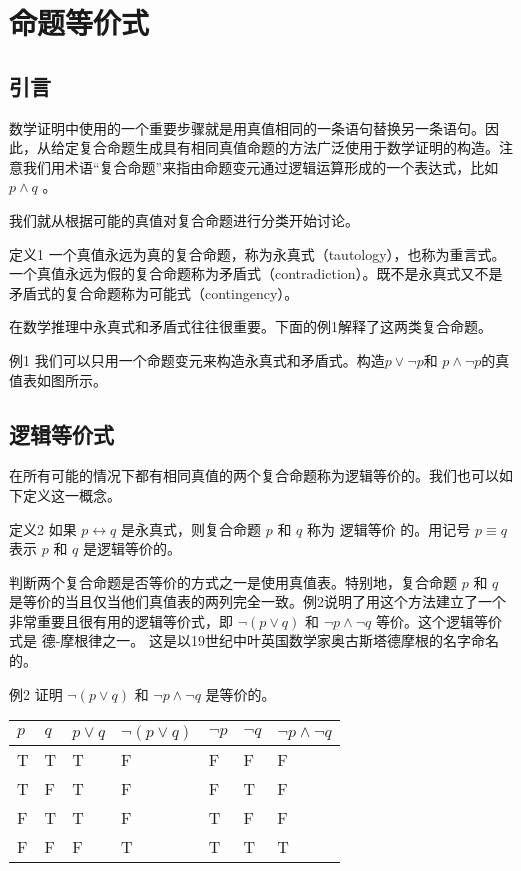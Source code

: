 \section{命题等价式}
\subsection{引言}
数学证明中使用的一个重要步骤就是用真值相同的一条语句替换另一条语句。因此，从给定复合命题生成具有相同真值命题的方法广泛使用于数学证明的构造。注意我们用术语“复合命题”来指由命题变元通过逻辑运算形成的一个表达式，比如 $p \land q$ 。  

我们就从根据可能的真值对复合命题进行分类开始讨论。

定义1  一个真值永远为真的复合命题，称为永真式（tautology），也称为重言式。一个真值永远为假的复合命题称为矛盾式（contradiction）。既不是永真式又不是矛盾式的复合命题称为可能式（contingency）。  

在数学推理中永真式和矛盾式往往很重要。下面的例1解释了这两类复合命题。

例1 我们可以只用一个命题变元来构造永真式和矛盾式。构造$p \lor \neg p $和 $p \land \neg p$的真值表如图所示。

\subsection{逻辑等价式}
在所有可能的情况下都有相同真值的两个复合命题称为逻辑等价的。我们也可以如下定义这一概念。   

定义2  如果 $p \leftrightarrow q$ 是永真式，则复合命题 $p$ 和 $q$ 称为 逻辑等价 的。用记号 $p \equiv q$ 表示 $p$ 和 $q$ 是逻辑等价的。  

判断两个复合命题是否等价的方式之一是使用真值表。特别地，复合命题 $p$ 和 $q$ 是等价的当且仅当他们真值表的两列完全一致。例2说明了用这个方法建立了一个非常重要且很有用的逻辑等价式，即 $\neg(p \lor q)$ 和 $\neg p \land \neg q$ 等价。这个逻辑等价式是 德-摩根律之一。 这是以19世纪中叶英国数学家奥古斯塔德摩根的名字命名的。

例2  证明 $\neg(p \lor q)$ 和 $\neg p \land \neg q$ 是等价的。

\begin{table}
	\begin{tabular}{l|l|l|l|l|l|l}
		\hline
		$p$	&	$q$	&	$p \lor q$	&	$\neg(p \lor q)$	&	$\neg p$	&	$\neg q$	&	$\neg p \land \neg q$	\\
		\hline
		T	&	T	&	T	&	F	&	F	&	F	&	F	\\
		T	&	F	&	T	&	F	&	F	&	T	&	F	\\
		F	&	T	&	T	&	F	&	T	&	F	&	F	\\
		F	&	F	&	F	&	T	&	T	&	T	&	T	\\
		\hline
	\end{tabular}
\end{table}

